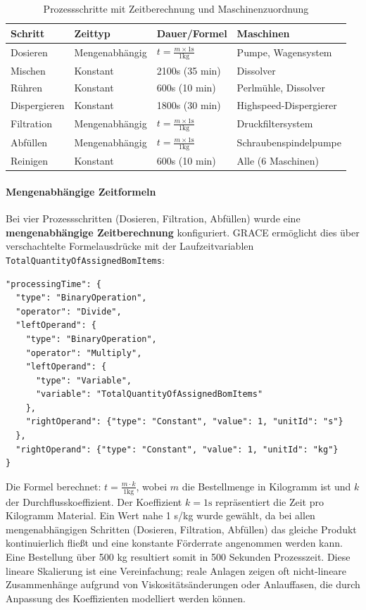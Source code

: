 \begin{table}[h]
\centering
\caption{Prozessschritte mit Zeitberechnung und Maschinenzuordnung}
\label{tab:ProzessZeitberechnung}
\begin{tabular}{llll}
\hline
\textbf{Schritt} & \textbf{Zeittyp} & \textbf{Dauer/Formel} & \textbf{Maschinen} \\
\hline
Dosieren & Mengenabhängig & $t = \frac{m \times 1\text{s}}{1\text{kg}}$ & Pumpe, Wagensystem \\
Mischen & Konstant & 2100s (35 min) & Dissolver \\
Rühren & Konstant & 600s (10 min) & Perlmühle, Dissolver \\
Dispergieren & Konstant & 1800s (30 min) & Highspeed-Dispergierer \\
Filtration & Mengenabhängig & $t = \frac{m \times 1\text{s}}{1\text{kg}}$ & Druckfiltersystem \\
Abfüllen & Mengenabhängig & $t = \frac{m \times 1\text{s}}{1\text{kg}}$ & Schraubenspindelpumpe \\
Reinigen & Konstant & 600s (10 min) & Alle (6 Maschinen) \\
\hline
\end{tabular}
\end{table}

\paragraph{Mengenabhängige Zeitformeln}

Bei vier Prozessschritten (Dosieren, Filtration, Abfüllen) wurde eine \textbf{mengenabhängige Zeitberechnung} konfiguriert. GRACE ermöglicht dies über verschachtelte Formelausdrücke mit der Laufzeitvariablen \texttt{TotalQuantityOfAssignedBomItems}:

\begin{verbatim}
"processingTime": {
  "type": "BinaryOperation",
  "operator": "Divide",
  "leftOperand": {
    "type": "BinaryOperation",
    "operator": "Multiply",
    "leftOperand": {
      "type": "Variable",
      "variable": "TotalQuantityOfAssignedBomItems"
    },
    "rightOperand": {"type": "Constant", "value": 1, "unitId": "s"}
  },
  "rightOperand": {"type": "Constant", "value": 1, "unitId": "kg"}
}
\end{verbatim}

Die Formel berechnet: $t = \frac{m \cdot k}{1\text{kg}}$, wobei $m$ die Bestellmenge in Kilogramm ist und $k$ der Durchflusskoeffizient. Der Koeffizient $k = 1\text{s}$ repräsentiert die Zeit pro Kilogramm Material. Ein Wert nahe 1 s/kg wurde gewählt, da bei allen mengenabhängigen Schritten (Dosieren, Filtration, Abfüllen) das gleiche Produkt kontinuierlich fließt und eine konstante Förderrate angenommen werden kann. Eine Bestellung über 500 kg resultiert somit in 500 Sekunden Prozesszeit. Diese lineare Skalierung ist eine Vereinfachung; reale Anlagen zeigen oft nicht-lineare Zusammenhänge aufgrund von Viskositätsänderungen oder Anlauffasen, die durch Anpassung des Koeffizienten modelliert werden können.


